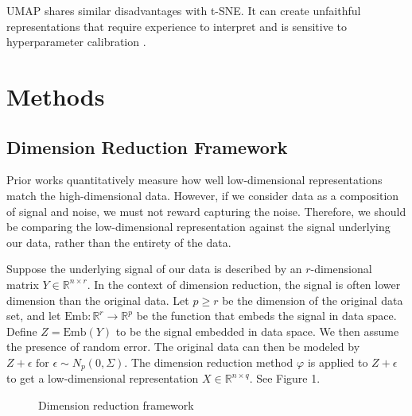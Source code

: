 \documentclass{article}
\begin{document}
UMAP shares similar disadvantages with t-SNE. It can create unfaithful representations that require experience to interpret and is sensitive to hyperparameter calibration \cite{understanding UMAP}.

\section{Methods}

\subsection{Dimension Reduction Framework}
Prior works quantitatively measure how well low-dimensional representations match the high-dimensional data. However, if we consider data as a composition of signal and noise, we must not reward capturing the noise. Therefore, we should be comparing the low-dimensional representation against the signal underlying our data, rather than the entirety of the data.

Suppose the underlying signal of our data is described by an $r$-dimensional matrix $Y \in \mathbb{R}^{n \times r}$. In the context of dimension reduction, the signal is often lower dimension than the original data. Let $p \geq r$ be the dimension of the original data set, and let $\textrm{Emb}:\mathbb{R}^r \to \mathbb{R}^p$ be the function that embeds the signal in data space. Define $Z = \textrm{Emb}(Y)$ to be the signal embedded in data space. We then assume the presence of random error. The original data can then be modeled by $Z + \epsilon \textrm{ for } \epsilon \sim N_p(0, \Sigma)$. The dimension reduction method $\varphi$ is applied to $Z + \epsilon$ to get a low-dimensional representation $X \in \mathbb{R}^{n \times q}$. See Figure 1.

\renewcommand{\thefigure}{1}
\begin{figure}[H]
\centering
{}
\caption{Dimension reduction framework}
\end{figure}
\end{document}
